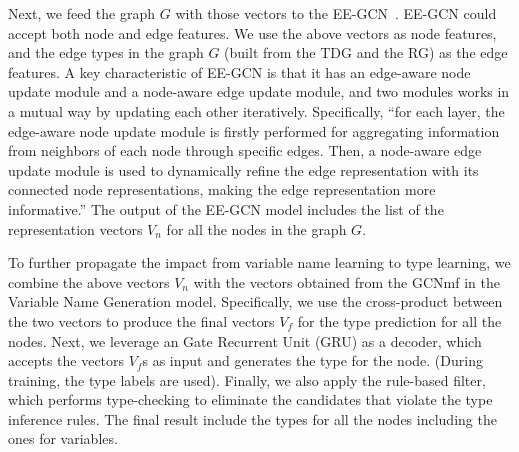 Next, we feed the graph $G$ with those vectors to the
EE-GCN~\cite{ee-gcn}. EE-GCN could accept both node and edge features.
We use the above vectors as node features, and the edge types in the
graph $G$ (built from the TDG and the RG) as the edge features. A key
characteristic of EE-GCN is that it has an edge-aware node update
module and a node-aware edge update module, and two modules works in a
mutual way by updating each other iteratively. Specifically, ``for
each layer, the edge-aware node update module is firstly performed for
aggregating information from neighbors of each node through specific
edges. Then, a node-aware edge update module is used to dynamically
refine the edge representation with its connected node
representations, making the edge representation more informative.''
The output of the EE-GCN model includes the list of the representation
vectors $V_n$ for all the nodes in the graph $G$.

To further propagate the impact from variable name learning to type
learning, we combine the above vectors $V_n$ with the vectors obtained
from the GCNmf in the Variable Name Generation model. Specifically, we
use the cross-product between the two vectors to produce the final
vectors $V_f$ for the type prediction for all the nodes. Next, we
leverage an Gate Recurrent Unit (GRU) as a decoder, which accepts the
vectors $V_f$s as input and generates the type for the node. (During
training, the type labels are used). Finally, we also apply the
rule-based filter, which performs type-checking to eliminate the
candidates that violate the type inference rules. The final
result include the types for all the nodes including the ones for
variables.









